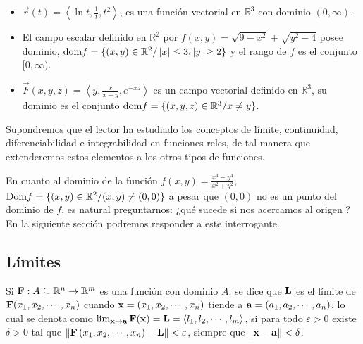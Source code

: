 \begin{itemize}
  \item $\overrightarrow{r}(t) =\left\langle \ln t,\frac{1}{t},t^{2}\right\rangle $, es
    una función vectorial en $\mathbb{R}^{3}$ con dominio $(0,\infty )$.
  \item El campo escalar definido en $\mathbb{R}^{2}$ por $f(x,y) =\sqrt{9-x^{2}}+\sqrt{y^{2}-4}$ posee
    dominio, ${\rm dom}f=\{(x,y) \in \mathbb{R}^{2}/\left\vert x\right\vert \leq 3,\left\vert y\right\vert \geq 2\}$ y el rango de $f$ es el conjunto $[0,\infty)$.
  \item $\overrightarrow{F}(x,y,z) =\left\langle y,\frac{x}{x-y},e^{-xz}\right\rangle$
    es un campo vectorial definido en $\mathbb{R}^{3}$, su dominio es el conjunto
    ${\rm dom}f=\{(x,y,z) \in \mathbb{R}^{3}/x\neq y\}$.
\end{itemize}
Supondremos que el lector ha estudiado los conceptos de límite, continuidad, diferenciabilidad e integrabilidad
en funciones reles, de tal manera que extenderemos estos elementos a los otros tipos de funciones.

En cuanto al dominio de la función $f(x,y) =\frac{x^{4}-y^{4}}{x^{2}+y^{2}}$,
${\rm Dom}f=\{(x,y) \in \mathbb{R}^{2}/(x,y) \neq \left( 0,0\right)\}$
a pesar que $\left( 0,0\right) $ no es un punto del dominio de $f$,
es natural preguntarnos: ¿qué sucede si nos acercamos al origen ? En la siguiente sección podremos
responder a este interrogante.

\subsection{Límites}

\begin{defi} \label{preliminares5}
  Si {\small $\mathbf{F}: A \subseteq\mathbb{R}^n \to  \mathbb{R}^m$} es una función con dominio $A$,
  se dice que $\mathbf{L}$ es el límite de $\mathbf{F}(x_{1},x_{2},\cdots ,x_{n})$ cuando
  ${\bf x}=\left(x_{1},x_{2},\cdots ,x_{n}\right)$ tiende a ${\bf a}= \left( a_{1},a_{2},\cdots,a_{n}\right) $,
  lo cual se denota como {\small $ \lim_{{\bf x}\to {\bf a}}\mathbf{F}({\bf x})=\mathbf{L}=\langle l_{1},l_{2},\cdots ,l_{m}\rangle$},
  si para todo {\small $\varepsilon >0$} existe $\delta >0$ tal que {\small $\left\Vert \mathbf{F}\left( x_{1},x_{2},\cdots ,x_{n}\right) -\mathbf{L}\right\Vert <\varepsilon$,}
  siempre que $\left\Vert {\bf x}- {\bf a} \right\Vert <\delta $.
\end{defi}

